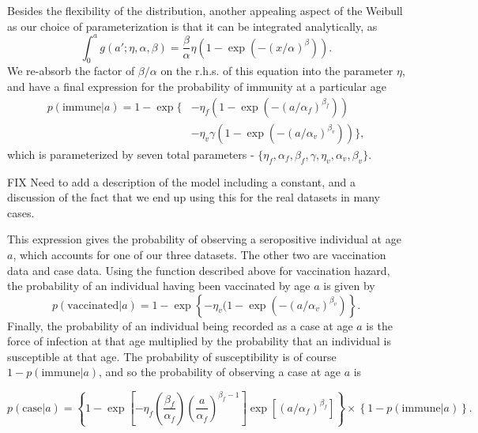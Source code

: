 \documentclass[nofootinbib,aps,pre,twocolumn,superscriptaddress,showkeys,showpacs]{revtex4-1}
\begin{document}
Besides the flexibility of the distribution, another appealing aspect of the Weibull as our choice of parameterization is that it can be integrated analytically, as
\begin{equation}
\int_0^a g(a';\eta,\alpha,\beta) = \frac{\beta}{\alpha} \eta \left( 1 - \exp(-(x/\alpha)^\beta) \right).
\end{equation}
We re-absorb the factor of $\beta/\alpha$ on the r.h.s. of this equation into the parameter $\eta$, and have a final expression for the probability of immunity at a particular age
\begin{align}
p(\mathrm{immune}|a) = 1 - \exp\big\{&-\eta_f\left(1-\exp(-(a/\alpha_f)^{\beta_f})\right)  \nonumber \\ 
&-\eta_v \gamma \left(1-\exp(-(a/\alpha_v)^{\beta_v}) \right)  \big\},
\end{align}
which is parameterized by seven total parameters - $\{\eta_f, \alpha_f, \beta_f, \gamma, \eta_v, \alpha_v, \beta_v\}$.

FIX Need to add a description of the model including a constant, and a discussion of the fact that we end up using this for the real datasets in many cases.

This expression gives the probability of observing a seropositive individual at age $a$, which accounts for one of our three datasets. The other two are vaccination data and case data. Using the function described above for vaccination hazard, the probability of an individual having been vaccinated by age $a$ is given by
\begin{equation}
p(\mathrm{vaccinated}|a) = 1 - \exp \left\{ - \eta_v (1-\exp\left(-(a/\alpha_v)^{\beta_v}\right) \right\}.
\end{equation}
Finally, the probability of an individual being recorded as a case at age $a$ is the force of infection at that age multiplied by the probability that an individual is susceptible at that age. The probability of susceptibility is of course $1 - p(\mathrm{immune}|a)$, and so the probability of observing a case at age $a$ is
\begin{widetext}
\begin{equation}
p(\mathrm{case}|a) = \left\{ 1 - \exp\left[ -\eta_f \left( \frac{\beta_f}{\alpha_f}\right)\left(\frac{a}{\alpha_f}\right)^{\beta_f - 1}\right] \exp\left[ (a/\alpha_f)^{\beta_f}\right] \right\}
\times \left\{ 1-p(\mathrm{immune}|a)\right\}.
\end{equation}
\end{widetext}
\end{document}
